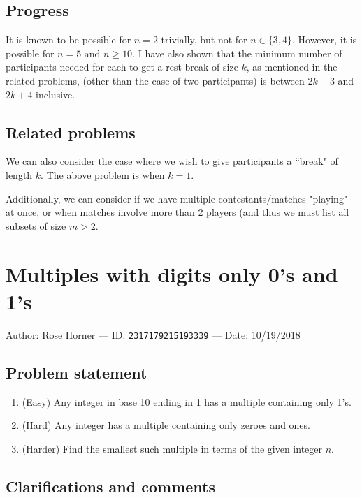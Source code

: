\documentclass[10pt]{article}
\begin{document}
\subsection{Progress}

It is known to be possible for $n=2$ trivially, but not for $n\in\{3,4\}$. However, it is possible for $n=5$ and $n\geq 10$. I have also shown that the minimum number of participants needed for each to get a rest break of size $k$, as mentioned in the related problems, (other than the case of two participants) is between $2k+3$ and $2k+4$ inclusive.

\subsection{Related problems}

We can also consider the case where we wish to give participants a ``break" of length $k$. The above problem is when $k=1$.

Additionally, we can consider if we have multiple contestants/matches "playing" at once, or when matches involve more than 2 players (and thus we must list all subsets of size $m>2$.

\pagebreak

\section{Multiples with digits only 0's and 1's}

Author: Rose Horner --- ID: \verb`2317179215193339` --- Date: 10/19/2018

\subsection{Problem statement}

\begin{enumerate}
    \item (Easy) Any integer in base 10 ending in 1 has a multiple containing only 1's.
    \item (Hard) Any integer has a multiple containing only zeroes and ones.
    \item (Harder) Find the smallest such multiple in terms of the given integer $n$.
\end{enumerate}

\subsection{Clarifications and comments}
\end{document}
